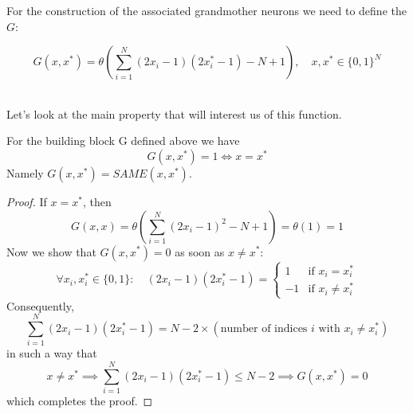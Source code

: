 \noindent

\begin{definicion}
    For the construction of the associated grandmother neurons we need to define the  $G$:

    \begin{equation*}
        G(x,x^*)=\theta \left( \sum_{i=1}^{N} (2x_i - 1)(2x_i^* - 1) - N + 1 \right) , \quad x, x^* \in \{0, 1\}^N
    \end{equation*} \\
\end{definicion} 

\noindent
Let's look at the main property that will interest us of this function.

\begin{prop}
    For the building block G defined above we have
    \begin{equation*}
        G(x, x^* )= 1 \iff x = x^*
    \end{equation*}
    Namely $G(x, x^* )= SAME(x,x^*)$.
    \begin{proof}
        If $x = x^*$, then
        \begin{equation*}
            G(x, x) = \theta \left( \sum_{i=1}^{N} (2x_i - 1)^2 - N + 1 \right) = \theta(1) = 1
        \end{equation*}
        Now we show that $G(x, x^* ) = 0$ as soon as $x \neq x^*$:
        \begin{equation*}
            \forall x_i, x_i^*\in \{0, 1\}: \quad (2x_i - 1)(2x_i^* - 1) = \begin{cases}
                1 & \text{if } x_i = x_i^* \\
                -1 & \text{if } x_i \neq x_i^*
            \end{cases}
        \end{equation*}
        Consequently,
        \begin{equation*}
            \sum_{i=1}^{N} (2x_i - 1)(2x_i^* - 1) = N - 2 \times (\text{number of indices } i \text{ with } x_i \neq x_i^* )
        \end{equation*}
        in such a way that
        \begin{equation*}
            x \neq x^* \implies \sum_{i=1}^{N} (2x_i - 1)(2x_i^* - 1) \leq N - 2 \implies G(x, x^* ) = 0
        \end{equation*}
        which completes the proof.
    \end{proof}
\end{prop}

